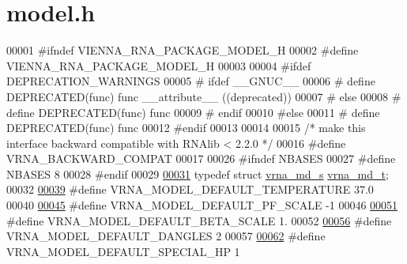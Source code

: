 \hypertarget{model_8h_source}{}\section{model.\+h}
\label{model_8h_source}

\begin{DoxyCode}
00001 \textcolor{preprocessor}{#ifndef VIENNA\_RNA\_PACKAGE\_MODEL\_H}
00002 \textcolor{preprocessor}{#define VIENNA\_RNA\_PACKAGE\_MODEL\_H}
00003 
00004 \textcolor{preprocessor}{#ifdef DEPRECATION\_WARNINGS}
00005 \textcolor{preprocessor}{# ifdef \_\_GNUC\_\_}
00006 \textcolor{preprocessor}{#  define DEPRECATED(func) func \_\_attribute\_\_ ((deprecated))}
00007 \textcolor{preprocessor}{# else}
00008 \textcolor{preprocessor}{#  define DEPRECATED(func) func}
00009 \textcolor{preprocessor}{# endif}
00010 \textcolor{preprocessor}{#else}
00011 \textcolor{preprocessor}{# define DEPRECATED(func) func}
00012 \textcolor{preprocessor}{#endif}
00013 
00014 
00015 \textcolor{comment}{/* make this interface backward compatible with RNAlib < 2.2.0 */}
00016 \textcolor{preprocessor}{#define VRNA\_BACKWARD\_COMPAT}
00017 
00026 \textcolor{preprocessor}{#ifndef NBASES}
00027 \textcolor{preprocessor}{#define NBASES 8}
00028 \textcolor{preprocessor}{#endif}
00029 
\hypertarget{model_8h_source_l00031}{}\hyperlink{group__model__details_ga1f8a10e12a0a1915f2a4eff0b28ea17c}{00031} \textcolor{keyword}{typedef} \textcolor{keyword}{struct }\hyperlink{group__model__details_structvrna__md__s}{vrna\_md\_s}  \hyperlink{group__model__details_structvrna__md__s}{vrna\_md\_t};
00032 
\hypertarget{model_8h_source_l00039}{}\hyperlink{group__model__details_gaf47f9850b3b4763479f7a7e7a15648a2}{00039} \textcolor{preprocessor}{#define VRNA\_MODEL\_DEFAULT\_TEMPERATURE    37.0}
00040 
\hypertarget{model_8h_source_l00045}{}\hyperlink{group__model__details_ga5505389cba74a18bbc116d2bb20256fa}{00045} \textcolor{preprocessor}{#define VRNA\_MODEL\_DEFAULT\_PF\_SCALE       -1}
00046 
\hypertarget{model_8h_source_l00051}{}\hyperlink{group__model__details_ga383d3ac8d08c3b6221754b50871c1200}{00051} \textcolor{preprocessor}{#define VRNA\_MODEL\_DEFAULT\_BETA\_SCALE     1.}
00052 
\hypertarget{model_8h_source_l00056}{}\hyperlink{group__model__details_ga2aa7bc2cae774b83a5c468f824c27a42}{00056} \textcolor{preprocessor}{#define VRNA\_MODEL\_DEFAULT\_DANGLES        2}
00057 
\hypertarget{model_8h_source_l00062}{}\hyperlink{group__model__details_gabd1ab224e1048defd45c165ed7d1c108}{00062} \textcolor{preprocessor}{#define VRNA\_MODEL\_DEFAULT\_SPECIAL\_HP     1}

\end{DoxyCode}
